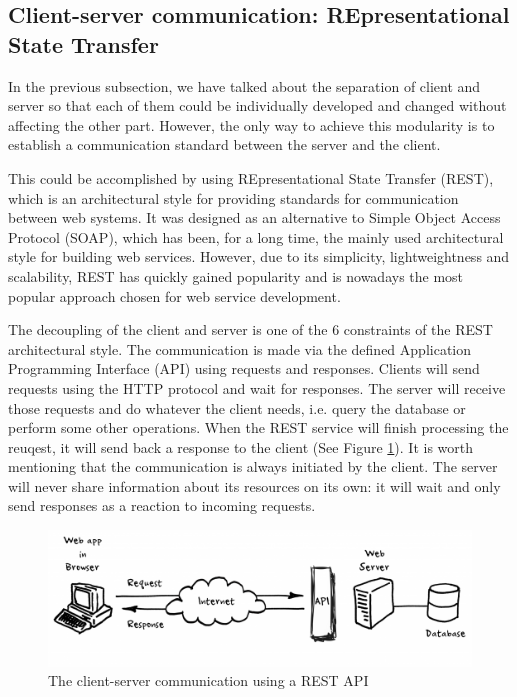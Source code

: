 \subsection{Client-server communication: REpresentational State Transfer}
\label{subsection:rest}

In the previous subsection, we have talked about the separation of client and server so that each of them could be individually developed and changed without affecting the other part. However, the only way to achieve this modularity is to establish a communication standard between the server and the client.

This could be accomplished by using REpresentational State Transfer (REST), which is an architectural style for providing standards for communication between web systems. It was designed as an alternative to Simple Object Access Protocol (SOAP), which has been, for a long time, the mainly used architectural style for building web services. However, due to its simplicity, lightweightness and scalability, REST has quickly gained popularity and is nowadays the most popular approach chosen for web service development.

The decoupling of the client and server is one of the 6 constraints of the REST architectural style. The communication is made via the defined Application Programming Interface (API) using requests and responses. Clients will send requests using the HTTP protocol and wait for responses. The server will receive those requests and do whatever the client needs, i.e. query the database or perform some other operations. When the REST service will finish processing the reuqest, it will send back a response to the client (See Figure \ref{rest}). It is worth mentioning that the communication is always initiated by the client. The server will never share information about its resources on its own: it will wait and only send responses as a reaction to incoming requests.

\begin{figure}[H]
    \centering
    \includegraphics[width=5in]{images/rest}
    \caption{The client-server communication using a REST API \cite{rest}}
    \label{rest}
\end{figure}

